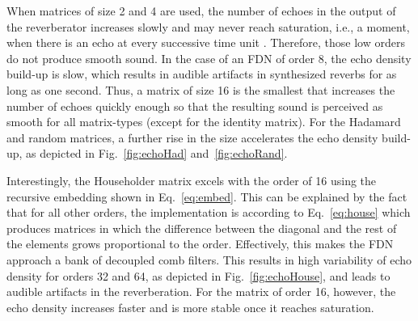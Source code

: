 \documentclass[twoside,a4paper]{article}
\begin{document}
When matrices of size 2 and 4 are used, the number of echoes in the output of the reverberator increases slowly and may never reach saturation, i.e., a moment, when there is an echo at every successive time unit \cite{schlecht:2016:echo}. Therefore, those low orders do not produce smooth sound. In the case of an FDN of order 8, the echo density build-up is slow, which results in audible artifacts in synthesized reverbs for as long as one second. Thus, a matrix of size 16 is the smallest that increases the number of echoes quickly enough so that the resulting sound is perceived as smooth for all matrix-types (except for the identity matrix). For the Hadamard and random matrices, a further rise in the size accelerates the echo density build-up, as depicted in Fig.~\ref{fig:echoHad} and~\ref{fig:echoRand}.

Interestingly, the Householder matrix excels with the order of 16 using the recursive embedding shown in Eq.~\eqref{eq:embed}. This can be explained by the fact that for all other orders, the implementation is according to Eq.~\eqref{eq:house} which produces matrices in which the difference between the diagonal and the rest of the elements grows proportional to the order. Effectively, this makes the FDN approach a bank of decoupled comb filters. This results in high variability of echo density for orders 32 and 64, as depicted in Fig.~\ref{fig:echoHouse}, and leads to audible artifacts in the reverberation. For the matrix of order 16, however, the echo density increases faster and is more stable once it reaches saturation.
\end{document}
